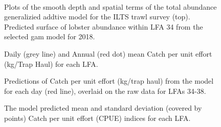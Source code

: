 \documentclass[11pt]{article}
\newcommand{\e}{/SpinDr/backup/bio_data/bio.lobster/figures/LFA3438Framework2019/} %
\begin{document}
\begin{landscape}
 \begin{figure}
    \centering
              \\
                
        \caption{Plots of the smooth depth and spatial terms of the total abundance generalizied addtive model for the ILTS trawl survey (top). Predicted surface of lobster abundance within LFA 34 from the selected gam model for 2018.}

    \end{figure}
\end{landscape}


  \begin{figure}
    \centering
        \caption{Daily (grey line) and Annual (red dot) mean Catch per unit effort (kg/Trap Haul) for each LFA.}

    \end{figure}



    \begin{figure}
    \centering
        \caption{Predictions of Catch per unit effort (kg/trap haul) from the model for each day (red line), overlaid on the raw data for LFAs 34-38. }

    \end{figure}

    \begin{figure}
    \centering
            \caption{The model predicted mean and standard deviation (covered by points) Catch per unit effort (CPUE) indices for each LFA. }

  \end{figure}
\end{document}
